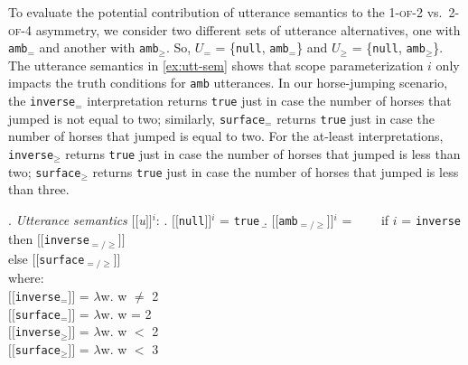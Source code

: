 \documentclass[preprint,authoryear]{elsarticle}\frenchspacing
\newcommand{\sem}[1]{\mbox{$[\![$#1$]\!]$}}
\newcommand{\lp}[1]{\textcolor{red}{#1}} %
\begin{document}
To evaluate the potential contribution of utterance semantics to the \textsc{1-of-2} vs.~\textsc{2-of-4} asymmetry, we consider two different sets of utterance alternatives, one with \texttt{amb$_{=}$} and another with \texttt{amb$_{\geq}$}. So, $U_{=}$ = \{\texttt{null}, \texttt{amb$_{=}$}\} and $U_{\geq}$ = \{\texttt{null}, \texttt{amb$_{\geq}$}\}. The utterance semantics in \ref{ex:utt-sem} shows that scope parameterization $i$ only impacts the truth conditions for \texttt{amb} utterances.
In our horse-jumping scenario, the
\texttt{inverse$_=$} interpretation returns \texttt{true} just in case the number of horses that jumped is not equal to two; similarly, 
\texttt{surface$_=$} returns \texttt{true} just in case the number of horses that jumped is equal to two.
For the at-least interpretations, \texttt{inverse$_\geq$} returns \texttt{true} just in case the number of horses that jumped is less than two; 
\texttt{surface$_\geq$} returns \texttt{true} just in case the number of horses that jumped is less than three.

\ex. \label{ex:utt-sem} \emph{Utterance semantics} \sem{\textit{u}}$^{i}$:
\a. \sem{\texttt{null}}$^{i}$ = \texttt{true}
\b. \sem{\texttt{amb$_{=/\geq}$}}$^{i}$ = \ \ \ \ if $i$ = \texttt{inverse} then \sem{\texttt{inverse$_{=/\geq}$}}\\
\phantom{\sem{\texttt{amb$_{=/\geq}$}}$^{i}$ = \ \ \ \ }else \sem{\texttt{surface$_{=/\geq}$}}\\
 where:\\
\sem{\texttt{inverse$_{=}$}} = $\lambda$w. w $\neq$ 2\\
\sem{\texttt{surface$_{=}$}} = $\lambda$w. w = 2\\
\sem{\texttt{inverse$_{\geq}$}} = $\lambda$w. w $<$ 2 \\
\sem{\texttt{surface$_{\geq}$}} = $\lambda$w. w $<$ 3
\end{document}
